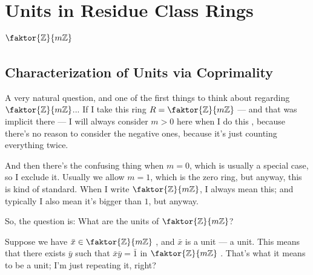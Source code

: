 \section{Units in Residue Class Rings \texorpdfstring{$\faktor{\mathbb{Z}}{m\mathbb{Z}}$}{Z/mZ}}

\subsection{Characterization of Units via Coprimality}

\begin{speech}[00:30:47 - 00:32:27]
A very natural question, and one of the first things to think about regarding $\faktor{\mathbb{Z}}{m\mathbb{Z}}$... If I take this ring $R = \faktor{\mathbb{Z}}{m\mathbb{Z}}$  --- and that was implicit there --- I will always consider $m > 0$ here when I do this , because there's no reason to consider the negative ones, because it's just counting everything twice.

And then there's the confusing thing when $m = 0$, which is usually a special case, so I exclude it. Usually we allow $m = 1$, which is the zero ring, but anyway, this is kind of standard. When I write $\faktor{\mathbb{Z}}{m\mathbb{Z}}$, I always mean this; and typically I also mean it's bigger than $1$, but anyway.

So, the question  is: What are the units  of $\faktor{\mathbb{Z}}{m\mathbb{Z}}$?

Suppose we have $\bar{x} \in \faktor{\mathbb{Z}}{m\mathbb{Z}}$ , and $\bar{x}$ is a unit  --- a unit. This means that there exists $\bar{y}$ such that  $\bar{x}\bar{y} = \bar{1}$ in $\faktor{\mathbb{Z}}{m\mathbb{Z}}$ . That's what it means to be a unit; I'm just repeating it, right?
\end{speech}

